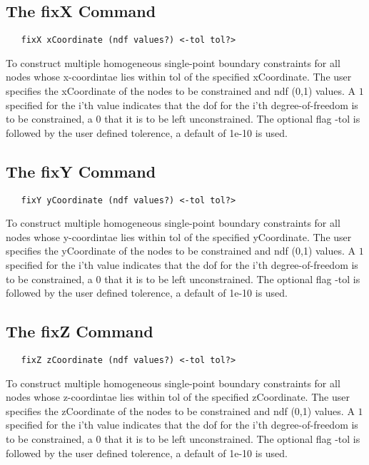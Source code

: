 \documentclass[12pt]{article}
\begin{document}
\subsection{The fixX Command}
{\sf\small
\begin{verbatim}
   fixX xCoordinate (ndf values?) <-tol tol?>
\end{verbatim}
}

To construct multiple homogeneous single-point boundary constraints for 
all nodes whose x-coordintae lies within tol of the specified xCoordinate.
The user specifies the xCoordinate of the nodes to be constrained and ndf (0,1)
values. A $1$ specified for the i'th value indicates that the dof for
the i'th degree-of-freedom is to be constrained, a $0$ that it is to be
left unconstrained. The optional flag -tol is followed by the user defined 
tolerence, a default of 1e-10 is used.

\subsection{The fixY Command}
{\sf\small
\begin{verbatim}
   fixY yCoordinate (ndf values?) <-tol tol?>
\end{verbatim}
}

To construct multiple homogeneous single-point boundary constraints for 
all nodes whose y-coordintae lies within tol of the specified yCoordinate.
The user specifies the yCoordinate of the nodes to be constrained and ndf (0,1)
values. A $1$ specified for the i'th value indicates that the dof for
the i'th degree-of-freedom is to be constrained, a $0$ that it is to be
left unconstrained. The optional flag -tol is followed by the user defined 
tolerence, a default of 1e-10 is used.

\subsection{The fixZ Command}
{\sf\small
\begin{verbatim}
   fixZ zCoordinate (ndf values?) <-tol tol?>
\end{verbatim}
}

To construct multiple homogeneous single-point boundary constraints for 
all nodes whose z-coordintae lies within tol of the specified zCoordinate.
The user specifies the zCoordinate of the nodes to be constrained and ndf (0,1)
values. A $1$ specified for the i'th value indicates that the dof for
the i'th degree-of-freedom is to be constrained, a $0$ that it is to be
left unconstrained. The optional flag -tol is followed by the user defined 
tolerence, a default of 1e-10 is used.
\end{document}
